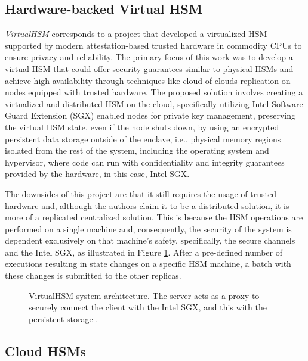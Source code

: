 \subsection{Hardware-backed Virtual HSM} \label{subsec:rosahsm}

\textit{VirtualHSM} \cite{rosahsmthesis} corresponds to a project that developed a virtualized HSM supported by modern attestation-based trusted hardware in commodity CPUs to ensure privacy and reliability. The primary focus of this work was to develop a virtual HSM that could offer security guarantees similar to physical HSMs and achieve high availability through techniques like cloud-of-clouds replication on nodes equipped with trusted hardware. The proposed solution involves creating a virtualized and distributed HSM on the cloud, specifically utilizing Intel Software Guard Extension (SGX) \cite{intelsgx} enabled nodes for private key management, preserving the virtual HSM state, even if the node shuts down, by using an encrypted persistent data storage outside of the enclave, i.e., physical memory regions isolated from the rest of the system, including the operating system and hypervisor, where code can run with confidentiality and integrity guarantees provided by the hardware, in this case, Intel SGX. 

The downsides of this project are that it still requires the usage of trusted hardware and, although the authors claim it to be a distributed solution, it is more of a replicated centralized solution. This is because the HSM operations are performed on a single machine and, consequently, the security of the system is dependent exclusively on that machine's safety, specifically, the secure channels and the Intel SGX, as illustrated in Figure \ref{fig:3.rosahsm}. After a pre-defined number of executions resulting in state changes on a specific HSM machine, a batch with these changes is submitted to the other replicas.

\begin{figure}[h]
    \begin{center}
    \end{center}
    \caption{VirtualHSM system architecture. The server acts as a proxy to securely connect the client with the Intel SGX, and this with the persistent storage \cite{rosahsmthesis}.}
    \label{fig:3.rosahsm}
\end{figure}


\subsection{Cloud HSMs} \label{subsec:cloudhsms}

